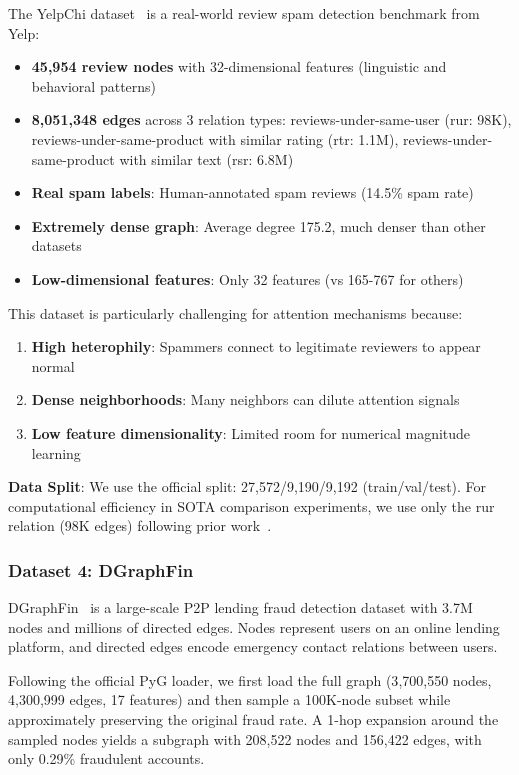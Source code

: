 The YelpChi dataset~\cite{mukherjee2013yelp,dou2020enhancing} is a real-world review spam detection benchmark from Yelp:
\begin{itemize}
\item \textbf{45,954 review nodes} with 32-dimensional features (linguistic and behavioral patterns)
\item \textbf{8,051,348 edges} across 3 relation types: reviews-under-same-user (rur: 98K), reviews-under-same-product with similar rating (rtr: 1.1M), reviews-under-same-product with similar text (rsr: 6.8M)
\item \textbf{Real spam labels}: Human-annotated spam reviews (14.5\% spam rate)
\item \textbf{Extremely dense graph}: Average degree 175.2, much denser than other datasets
\item \textbf{Low-dimensional features}: Only 32 features (vs 165-767 for others)
\end{itemize}

This dataset is particularly challenging for attention mechanisms because:
\begin{enumerate}
\item \textbf{High heterophily}: Spammers connect to legitimate reviewers to appear normal
\item \textbf{Dense neighborhoods}: Many neighbors can dilute attention signals
\item \textbf{Low feature dimensionality}: Limited room for numerical magnitude learning
\end{enumerate}

\textbf{Data Split}: We use the official split: 27,572/9,190/9,192 (train/val/test). For computational efficiency in SOTA comparison experiments, we use only the rur relation (98K edges) following prior work~\cite{dou2020enhancing}.

\subsubsection{Dataset 4: DGraphFin}

DGraphFin~\cite{dgraph2022} is a large-scale P2P lending fraud detection
dataset with 3.7M nodes and millions of directed edges. Nodes represent
users on an online lending platform, and directed edges encode emergency
contact relations between users.

Following the official PyG loader, we first load the full graph
(3{,}700{,}550 nodes, 4{,}300{,}999 edges, 17 features) and then sample a
100K-node subset while approximately preserving the original fraud rate.
A 1-hop expansion around the sampled nodes yields a subgraph with
208{,}522 nodes and 156{,}422 edges, with only 0.29\% fraudulent
accounts.

